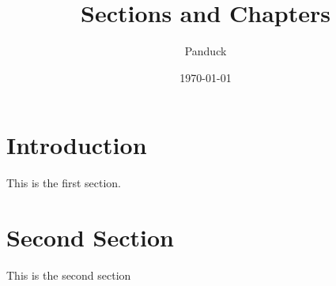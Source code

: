 \documentclass{article}
\title{Sections and Chapters}
\author{Panduck}
\date{\today}
\begin{document}
    \maketitle
    \section{Introduction}

    This is the first section.

    \blindtext

    \section{Second Section}
    This is the second section

    \blindtext
\end{document}
